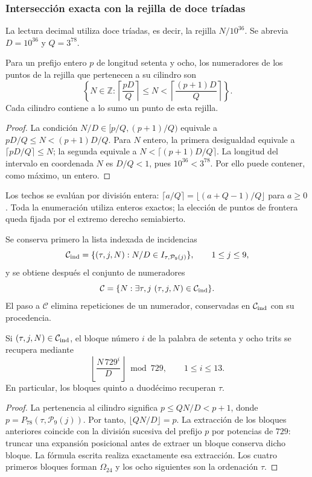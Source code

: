 \subsubsection{Intersección exacta con la rejilla de doce tríadas}

La lectura decimal utiliza doce tríadas, es decir, la rejilla
$N/10^{36}$. Se abrevia $D=10^{36}$ y $Q=3^{78}$.

\begin{lemma}
Para un prefijo entero $p$ de longitud setenta y ocho, los numeradores
de los puntos de la rejilla que pertenecen a su cilindro son
\begin{equation}
 \left\{N\in\mathbb Z:
 \left\lceil\frac{pD}{Q}\right\rceil
 \leq N<
 \left\lceil\frac{(p+1)D}{Q}\right\rceil\right\}.
 \label{act21:eq:kdes-rejilla}
\end{equation}
Cada cilindro contiene a lo sumo un punto de esta rejilla.
\end{lemma}
\begin{proof}
La condición $N/D\in[p/Q,(p+1)/Q)$ equivale a
$pD/Q\leq N<(p+1)D/Q$. Para $N$ entero, la primera desigualdad
equivale a $\lceil pD/Q\rceil\leq N$; la segunda equivale a
$N<\lceil(p+1)D/Q\rceil$. La longitud del intervalo en coordenada
$N$ es $D/Q<1$, pues $10^{36}<3^{78}$. Por ello puede contener,
como máximo, un entero.
\end{proof}

Los techos se evalúan por división entera:
$\lceil a/Q\rceil=\lfloor(a+Q-1)/Q\rfloor$ para $a\geq0$.
Toda la enumeración utiliza enteros exactos; la elección de puntos de
frontera queda fijada por el extremo derecho semiabierto.

Se conserva primero la lista indexada de incidencias
\[
 \mathcal C_{\rm ind}=
 \{(\tau,j,N):N/D\in I_{\tau,\mathcal P_9(j)}\},
 \qquad1\leq j\leq9,
\]
y se obtiene después el conjunto de numeradores
\[
 \mathcal C=\{N:\exists\tau,j\ (\tau,j,N)\in\mathcal C_{\rm ind}\}.
\]
El paso a $\mathcal C$ elimina repeticiones de un numerador, conservadas
en $\mathcal C_{\rm ind}$ con su procedencia.

\begin{lemma}
Si $(\tau,j,N)\in\mathcal C_{\rm ind}$, el bloque número $i$ de la
palabra de setenta y ocho trits se recupera mediante
\[
 \left\lfloor\frac{N\,729^i}{D}\right\rfloor\bmod729,
 \qquad1\leq i\leq13.
\]
En particular, los bloques quinto a duodécimo recuperan $\tau$.
\end{lemma}
\begin{proof}
La pertenencia al cilindro significa
$p\leq QN/D<p+1$, donde $p=P_{78}(\tau,\mathcal P_9(j))$.
Por tanto, $\lfloor QN/D\rfloor=p$. La extracción de los bloques
anteriores coincide con la división sucesiva del prefijo $p$ por
potencias de $729$: truncar una expansión posicional antes de extraer
un bloque conserva dicho bloque. La fórmula escrita realiza
exactamente esa extracción. Los cuatro primeros bloques forman
$\Omega_{24}$ y los ocho siguientes son la ordenación $\tau$.
\end{proof}

